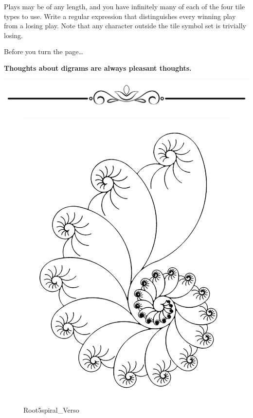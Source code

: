 \begin{Shaded}
\begin{Highlighting}[]
\OperatorTok{=} 
\OperatorTok{=} 
\end{Highlighting}
\end{Shaded}

Plays may be of any length, and you have infinitely many of each of the
four tile types to use. Write a regular expression that distinguishes
every winning play from a losing play. Note that any character outside
the tile symbol set is trivially losing.

Before you turn the page\ldots{}

\textbf{Thoughts about digrams are always pleasant thoughts.}

\includegraphics{images/Elegant-Flourish-Frame-Extrapolated-19.svg}

\begin{figure}
\centering
\includegraphics{images/Root5spiral_Verso.png}
\caption{Root5spiral\_Verso}
\end{figure}

